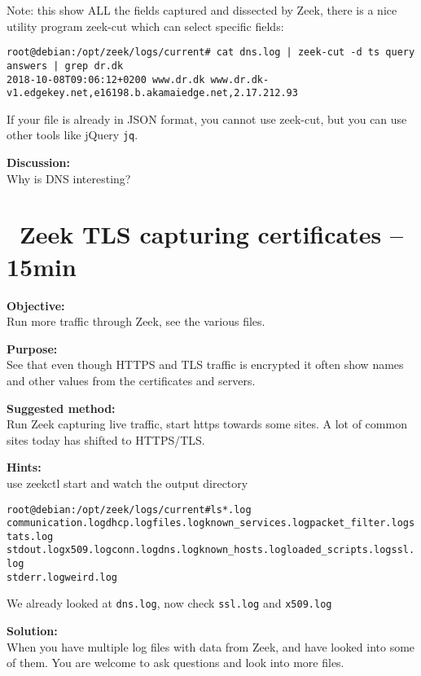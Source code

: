 \documentclass[a4paper,11pt,notitlepage]{report}
\begin{document}
Note: this show ALL the fields captured and dissected by Zeek, there is a nice utility program zeek-cut which can select specific fields:

\begin{verbatim}
root@debian:/opt/zeek/logs/current# cat dns.log | zeek-cut -d ts query answers | grep dr.dk
2018-10-08T09:06:12+0200 www.dr.dk www.dr.dk-v1.edgekey.net,e16198.b.akamaiedge.net,2.17.212.93
\end{verbatim}

If your file is already in JSON format, you cannot use zeek-cut, but you can use other tools like jQuery \verb+jq+.

{\bf Discussion:}\\
Why is DNS interesting?


\chapter{\faExclamationTriangle\ Zeek TLS capturing certificates -- 15min}
\label{ex:zeektlsbasic}


{\bf Objective:} \\
Run more traffic through Zeek, see the various files.


{\bf Purpose:}\\
See that even though HTTPS and TLS traffic is encrypted it often show names and other values from the certificates and servers.


{\bf Suggested method:}\\
Run Zeek capturing live traffic, start https towards some sites. A lot of common sites today has shifted to HTTPS/TLS.


{\bf Hints:}\\
use zeekctl start and watch the output directory

\begin{alltt}\small
root@debian:/opt/zeek/logs/current# ls *.log
communication.log  dhcp.log files.log known_services.log packet_filter.log  stats.log
stdout.log x509.log conn.log dns.log known_hosts.log loaded_scripts.log  ssl.log
stderr.log weird.log
\end{alltt}

We already looked at \verb+dns.log+, now check \verb+ssl.log+ and \verb+x509.log+

{\bf Solution:}\\
When you have multiple log files with data from Zeek, and have looked into some of them. You are welcome to ask questions and look into more files.
\end{document}
